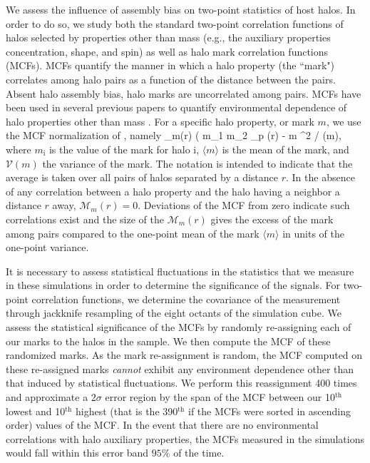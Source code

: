 \documentclass[usenatbib,usegraphicx,letterpaper]{mn2e}
\begin{document}
We assess the influence of assembly bias on two-point statistics of host halos. In order to do so, we 
study both the standard two-point correlation functions of halos selected by properties other than mass 
(e.g., the auxiliary properties concentration, shape, and spin) as well as halo mark correlation functions (MCFs). 
MCFs quantify the manner in which a halo property (the ``mark") correlates among halo pairs as a function of 
the distance between the pairs. Absent halo assembly bias, halo marks are uncorrelated among pairs. 
MCFs have been used in several previous papers to quantify environmental dependence of halo 
properties other than mass \citep{sheth04, harker06, wechsler06} . 
For a specific halo property, or mark $m$, we use the MCF normalization of \citet{wechsler06}, namely 
\beq
{}_m(r) \equiv ( \langle m_1 m_2 \rangle_p (r) - \langle m \rangle^2 / (m),
\eeq
where $m_{\mathrm{i}}$ is the value of the mark for halo $\mathrm{i}$, $\langle m \rangle$ is the mean of the mark, 
and $\mathcal{V}(m)$ the variance of the mark. The notation is intended to indicate that the average is taken over all 
pairs of halos separated by a distance $r$. In the absence of any correlation between a halo property and the halo 
having a neighbor a distance $r$ away, $\mathcal{M}_m(r) = 0$. Deviations of the MCF from zero indicate 
such correlations exist and the size of the $\mathcal{M}_m(r)$ gives the excess of the mark among pairs 
compared to the one-point mean of the mark $\langle m\rangle$ in units of the one-point variance.


It is necessary to assess statistical fluctuations in the statistics that we measure in these simulations in order to 
determine the significance of the signals. For two-point correlation functions, we determine the covariance of 
the measurement through jackknife resampling of the eight octants of the simulation cube. We assess the 
statistical significance of the MCFs by randomly re-assigning each of our marks to the halos in the sample. 
We then compute the MCF of these randomized marks. As the mark re-assignment is random, 
the MCF computed on these re-assigned marks {\em cannot} exhibit any 
environment dependence other than that induced by statistical fluctuations. 
We perform this reassignment 400 times and approximate a $2\sigma$ error region by 
the span of the MCF between our 10$^\mathrm{th}$ lowest and 10$^\mathrm{th}$ highest (that is the 390$^\mathrm{th}$ 
if the MCFs were sorted in ascending order) values of the MCF. In the event that there are no environmental 
correlations with halo auxiliary properties, the MCFs measured in the simulations would fall within this error 
band $95\%$ of the time. 
\end{document}
